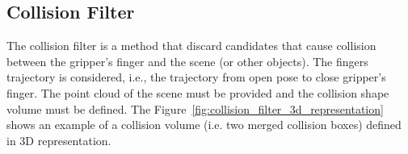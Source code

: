 \begin{snippet}[h!]
\centering
{}
\caption{Workspace filter pipeline descriptor example.}
\label{code:workspace_filter}
\end{snippet}


\subsection{Collision Filter}
\label{cap4:modular_grasping_architecture:sec:grasp_selection:subsec:collision_filter}

The collision filter is a method that discard candidates that cause collision between the gripper's finger and the scene (or other objects). The fingers trajectory is considered, i.e., the trajectory from open pose to close gripper's finger. The point cloud of the scene must be provided and the collision shape volume must be defined. The Figure~\ref{fig:collision_filter_3d_representation} shows an example of a collision volume (i.e. two merged collision boxes) defined in 3D representation.


\begin{figure}[h!] %
\end{figure}


